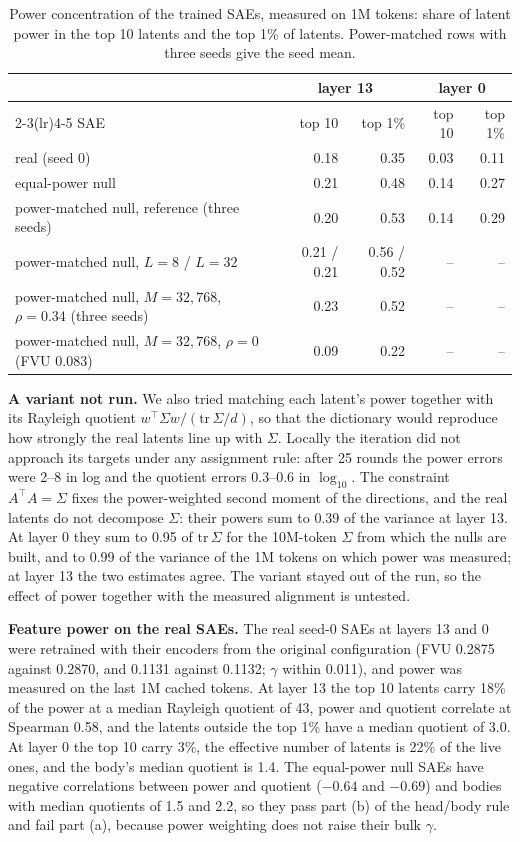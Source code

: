 \documentclass{article}
\newcommand{\Sig}{\Sigma}
\begin{document}
\begin{table}[!htb]
\centering
\caption{Power concentration of the trained SAEs, measured on 1M tokens: share of latent power in the top 10 latents and the top 1\% of latents. Power-matched rows with three seeds give the seed mean.}
\label{tab:manip}
\small
\begin{tabular}{l rr rr}
\toprule
 & \multicolumn{2}{c}{layer 13} & \multicolumn{2}{c}{layer 0} \\
\cmidrule(lr){2-3}\cmidrule(lr){4-5}
SAE & top 10 & top 1\% & top 10 & top 1\% \\
\midrule
real (seed 0) & 0.18 & 0.35 & 0.03 & 0.11 \\
equal-power null & 0.21 & 0.48 & 0.14 & 0.27 \\
power-matched null, reference (three seeds) & 0.20 & 0.53 & 0.14 & 0.29 \\
power-matched null, $L=8$ / $L=32$ & 0.21 / 0.21 & 0.56 / 0.52 & -- & -- \\
power-matched null, $M=32{,}768$, $\rho=0.34$ (three seeds) & 0.23 & 0.52 & -- & -- \\
power-matched null, $M=32{,}768$, $\rho=0$ (FVU 0.083) & 0.09 & 0.22 & -- & -- \\
\bottomrule
\end{tabular}
\end{table}

\textbf{A variant not run.} We also tried matching each latent's power together with its Rayleigh quotient $w^\top\Sig w/(\mathrm{tr}\,\Sig/d)$, so that the dictionary would reproduce how strongly the real latents line up with $\Sig$. Locally the iteration did not approach its targets under any assignment rule: after 25 rounds the power errors were 2--8 in log and the quotient errors 0.3--0.6 in $\log_{10}$. The constraint $A^\top A=\Sig$ fixes the power-weighted second moment of the directions, and the real latents do not decompose $\Sig$: their powers sum to 0.39 of the variance at layer 13. At layer 0 they sum to 0.95 of $\mathrm{tr}\,\Sig$ for the 10M-token $\Sig$ from which the nulls are built, and to 0.99 of the variance of the 1M tokens on which power was measured; at layer 13 the two estimates agree. The variant stayed out of the run, so the effect of power together with the measured alignment is untested.

\textbf{Feature power on the real SAEs.} The real seed-0 SAEs at layers 13 and 0 were retrained with their encoders from the original configuration (FVU 0.2875 against 0.2870, and 0.1131 against 0.1132; $\gamma$ within 0.011), and power was measured on the last 1M cached tokens. At layer 13 the top 10 latents carry 18\% of the power at a median Rayleigh quotient of 43, power and quotient correlate at Spearman 0.58, and the latents outside the top 1\% have a median quotient of 3.0. At layer 0 the top 10 carry 3\%, the effective number of latents is 22\% of the live ones, and the body's median quotient is 1.4. The equal-power null SAEs have negative correlations between power and quotient ($-0.64$ and $-0.69$) and bodies with median quotients of 1.5 and 2.2, so they pass part (b) of the head/body rule and fail part (a), because power weighting does not raise their bulk $\gamma$.
\end{document}
